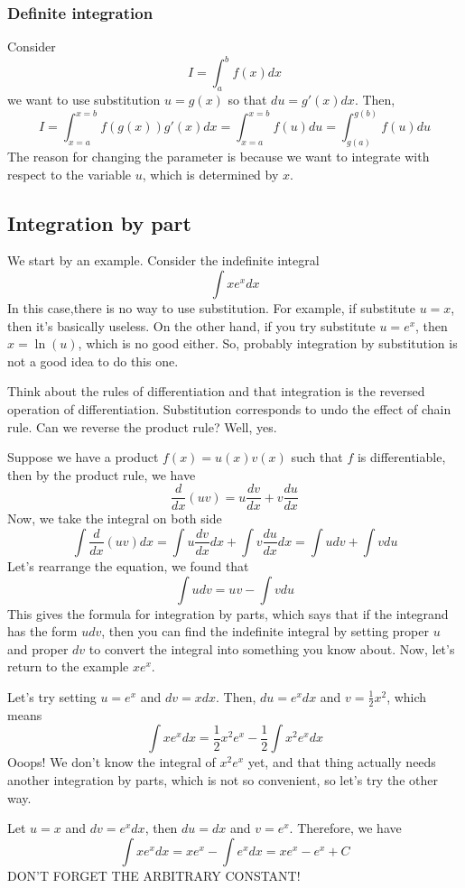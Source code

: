 \documentclass{article}
\theoremstyle{definition}
\theoremstyle{definition}
\theoremstyle{definition}
\theoremstyle{definition}
\theoremstyle{definition}
\theoremstyle{definition}
\theoremstyle{definition}
\theoremstyle{definition}
\theoremstyle{definition}
\begin{document}
\subsubsection{Definite integration}
Consider \[I=\int_a^b f(x)dx\]
we want to use substitution $u=g(x)$ so that $du=g'(x)dx$. Then, 
\[I = \int_{x=a}^{x=b}f(g(x))g'(x)dx = \int_{x=a}^{x=b}f(u)du = \int_{g(a)}^{g(b)}f(u)du\]
The reason for changing the parameter is because we want to integrate with respect to the variable $u$, which is determined by $x$.

\subsection{Integration by part}
We start by an example. Consider the indefinite integral
\[
\int xe^xdx
\]
In this case,there is no way to use substitution. For example, if substitute $u=x$, then it's basically useless. On the other hand, if you try substitute $u=e^x$, then $x=\ln(u)$, which is no good either. So, probably integration by substitution is not a good idea to do this one.

Think about the rules of differentiation and that integration is the reversed operation of differentiation. Substitution corresponds to undo the effect of chain rule. Can we reverse the product rule? Well, yes.

Suppose we have a product $f(x)=u(x)v(x)$ such that $f$ is differentiable, then by the product rule, we have 
\[\dfrac{d}{dx}(uv)=u\dfrac{dv}{dx}+v\dfrac{du}{dx}\]
Now, we take the integral on both side
\[
\int \dfrac{d}{dx}(uv)dx=\int u\dfrac{dv}{dx}dx+\int v\dfrac{du}{dx}dx=\int udv+\int vdu
\]
Let's rearrange the equation, we found that 
\[
\int udv=uv-\int vdu
\]
This gives the formula for integration by parts, which says that if the integrand has the form $udv$, then you can find the indefinite integral by setting proper $u$ and proper $dv$ to convert the integral into something you know about. Now, let's return to the example $xe^x$.

Let's try setting $u=e^x$ and $dv=xdx$. Then, $du=e^xdx$ and $v=\frac{1}{2}x^2$, which means
\[
\int xe^xdx=\dfrac{1}{2}x^2e^x-\dfrac{1}{2}\int x^2e^xdx
\]
Ooops! We don't know the integral of $x^2e^x$ yet, and that thing actually needs another integration by parts, which is not so convenient, so let's try the other way.

Let $u=x$ and $dv= e^xdx$, then $du=dx$ and $v=e^x$. Therefore, we have
\[
\int xe^xdx=xe^x-\int e^xdx=xe^x-e^x+C
\]
DON'T FORGET THE ARBITRARY CONSTANT!
\end{document}
